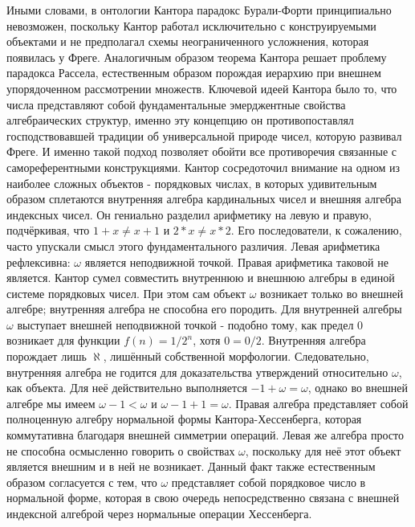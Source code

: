 \documentclass[12pt]{article}
\begin{document}
Иными словами, в онтологии Кантора парадокс Бурали-Форти принципиально невозможен, поскольку Кантор работал исключительно с конструируемыми объектами и не предполагал схемы неограниченного усложнения, которая появилась у Фреге. Аналогичным образом теорема Кантора решает проблему парадокса Рассела, естественным образом порождая иерархию при внешнем упорядоченном рассмотрении множеств. Ключевой идеей Кантора было то, что числа представляют собой фундаментальные эмерджентные свойства алгебраических структур, именно эту концепцию он противопоставлял господствовавшей традиции об универсальной природе чисел, которую развивал Фреге. И именно такой подход позволяет обойти все противоречия связанные с самореферентными конструкциями. Кантор сосредоточил внимание на одном из наиболее сложных объектов - порядковых числах, в которых удивительным образом сплетаются внутренняя алгебра кардинальных чисел и внешняя алгебра индексных чисел. Он гениально разделил арифметику на левую и правую, подчёркивая, что $1 + x \neq x + 1$ и $2 * x \neq x * 2$. Его последователи, к сожалению, часто упускали смысл этого фундаментального различия. Левая арифметика рефлексивна: $\omega$ является неподвижной точкой. Правая арифметика таковой не является. Кантор сумел совместить внутреннюю и внешнюю алгебры в единой системе порядковых чисел. При этом сам объект $\omega$ возникает только во внешней алгебре; внутренняя алгебра не способна его породить. Для внутренней алгебры $\omega$ выступает внешней неподвижной точкой - подобно тому, как предел $0$ возникает для функции $f(n) = 1/2^n$, хотя $0 = 0/2$. Внутренняя алгебра порождает лишь $\aleph$, лишённый собственной морфологии. Следовательно, внутренняя алгебра не годится для доказательства утверждений относительно $\omega$, как объекта. Для неё действительно выполняется $-1 + \omega = \omega$, однако во внешней алгебре мы имеем $\omega - 1 < \omega$ и $\omega - 1 + 1 = \omega$. Правая алгебра представляет собой полноценную алгебру нормальной формы Кантора-Хессенберга, которая коммутативна благодаря внешней симметрии операций. Левая же алгебра просто не способна осмысленно говорить о свойствах $\omega$, поскольку для неё этот объект является внешним и в ней не возникает. Данный факт также естественным образом согласуется с тем, что $\omega$ представляет собой порядковое число в нормальной форме, которая в свою очередь непосредственно связана с внешней индексной алгеброй через нормальные операции Хессенберга.
\end{document}
